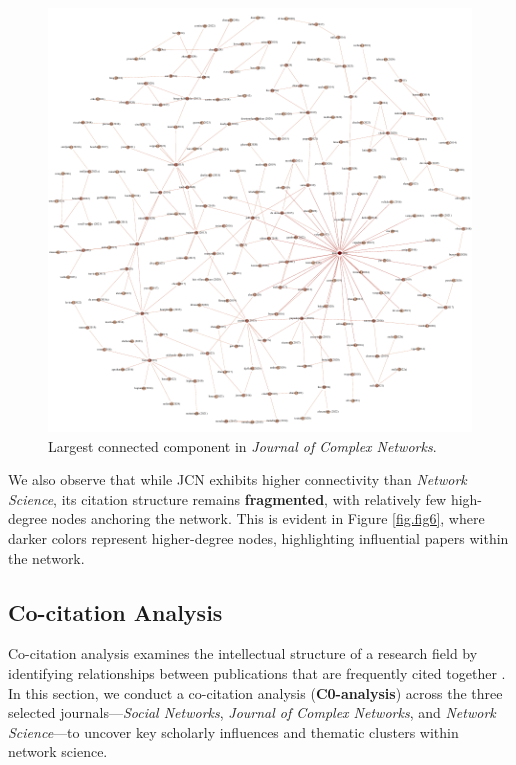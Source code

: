 \documentclass[twocolumn]{article}
\begin{document}
	\begin{figure}[htbp]
		\centering
		\includegraphics[width=\columnwidth]{"Journal of Complex Networks/Gephi/largest_component.pdf"}
		\caption{Largest connected component in \textit{Journal of Complex Networks}.}
		\label{fig.fig7}
	\end{figure}
	
	We also observe that while JCN exhibits higher connectivity than \textit{Network Science}, its citation structure remains \textbf{fragmented}, with relatively few high-degree nodes anchoring the network. This is evident in Figure \ref{fig.fig6}, where darker colors represent higher-degree nodes, highlighting influential papers within the network.
	
	\subsection{Co-citation Analysis}
	
	Co-citation analysis examines the intellectual structure of a research field by identifying relationships between publications that are frequently cited together \cite{small1973co}. In this section, we conduct a co-citation analysis (\textbf{C0-analysis}) across the three selected journals—\textit{Social Networks}, \textit{Journal of Complex Networks}, and \textit{Network Science}—to uncover key scholarly influences and thematic clusters within network science.
	
\end{document}
